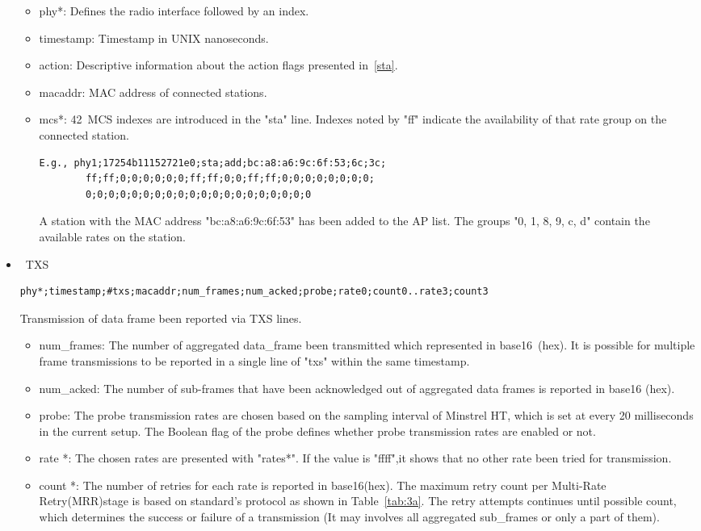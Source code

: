 \begin{sloppypar}
\begin{itemize}
    \begin{itemize} 
        \item phy*: Defines the radio interface followed by an index.
        \item timestamp: Timestamp in UNIX nanoseconds.
        \item action: Descriptive information about the action flags presented in~\ref{sta}.
        \item macaddr: MAC address of connected stations.
        \item mcs*: 42~MCS indexes are introduced in the "sta" line. Indexes noted by "ff" indicate the availability of that rate group on the connected station.
        \begin{lstlisting}[basicstyle=\small]
        E.g., phy1;17254b11152721e0;sta;add;bc:a8:a6:9c:6f:53;6c;3c;
        ff;ff;0;0;0;0;0;0;ff;ff;0;0;ff;ff;0;0;0;0;0;0;0;0;
        0;0;0;0;0;0;0;0;0;0;0;0;0;0;0;0;0;0;0;0
        \end{lstlisting}
        A station with the MAC address "bc:a8:a6:9c:6f:53" has been added to the AP list. The groups "0, 1, 8, 9, c, d" contain the available rates on the station. 
    \end{itemize}
    
\item \ TXS
\label{txs}
\begin{lstlisting}[basicstyle=\small]
phy*;timestamp;#txs;macaddr;num_frames;num_acked;probe;rate0;count0..rate3;count3
\end{lstlisting}
Transmission of data frame been reported via TXS lines.

    \begin{itemize}
        \item num\_frames: The number of aggregated data\_frame been transmitted which represented in base16~(hex). It is possible for multiple frame transmissions to be reported in a single line of "txs" within the same timestamp.
        \item num\_acked: The number of sub-frames that have been acknowledged out of aggregated data frames is reported in base16 (hex).
        \item probe: The probe transmission rates are chosen based on the sampling interval of Minstrel HT, which is set at every 20 milliseconds in the current setup. The Boolean flag of the probe defines whether probe transmission rates are enabled or not.
        \item rate *: The chosen rates are presented with "rates*". If the value is "ffff",it shows that no other rate been tried for transmission.
        \item count *: The number of retries for each rate is reported in base16(hex). The maximum retry count per Multi-Rate Retry(MRR)stage is based on standard's protocol as shown in Table~\ref{tab:3a}. The retry attempts continues until possible count, which determines the success or failure of a transmission (It may involves all aggregated sub\_frames or only a part of them).  
        

\end{itemize}
\end{itemize}
\end{sloppypar}

